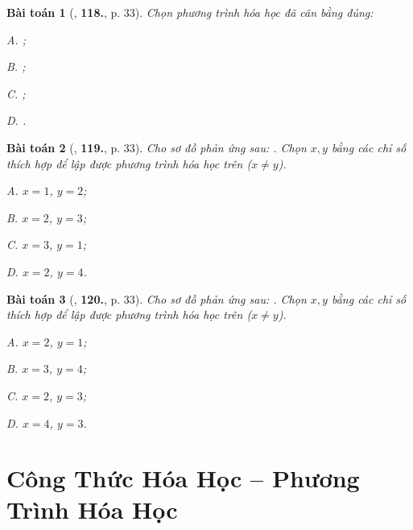 \documentclass{article}
\numberwithin{equation}{section}
\newtheorem{baitoan}{Bài toán}[section]
\begin{document}
\begin{baitoan}[\cite{An2011}, \textbf{118.}, p. 33]
	Chọn phương trình hóa học đã cân bằng đúng:
	\begin{enumerate*}
		\item[{\rm\sf A.}] \emph{};
		\item[{\rm\sf B.}] \emph{};
		\item[{\rm\sf C.}] \emph{};
		\item[{\rm\sf D.}] \emph{}.
	\end{enumerate*}
\end{baitoan}

\begin{baitoan}[\cite{An2011}, \textbf{119.}, p. 33]
	Cho sơ đồ phản ứng sau: \emph{}. Chọn $x,y$ bằng các chỉ số thích hợp để lập được phương trình hóa học trên ($x\ne y$).
	\begin{enumerate*}
		\item[{\rm\sf A.}] $x = 1$, $y = 2$;
		\item[{\rm\sf B.}] $x = 2$, $y = 3$;
		\item[{\rm\sf C.}] $x = 3$, $y = 1$;
		\item[{\rm\sf D.}] $x = 2$, $y = 4$.
	\end{enumerate*}
\end{baitoan}

\begin{baitoan}[\cite{An2011}, \textbf{120.}, p. 33]
	Cho sơ đồ phản ứng sau: \emph{}. Chọn $x,y$ bằng các chỉ số thích hợp để lập được phương trình hóa học trên ($x\ne y$).
	\begin{enumerate*}
		\item[{\rm\sf A.}] $x = 2$, $y = 1$;
		\item[{\rm\sf B.}] $x = 3$, $y = 4$;
		\item[{\rm\sf C.}] $x = 2$, $y = 3$;
		\item[{\rm\sf D.}] $x = 4$, $y = 3$.
	\end{enumerate*}
\end{baitoan}


\section{Công Thức Hóa Học -- Phương Trình Hóa Học}
\end{document}
